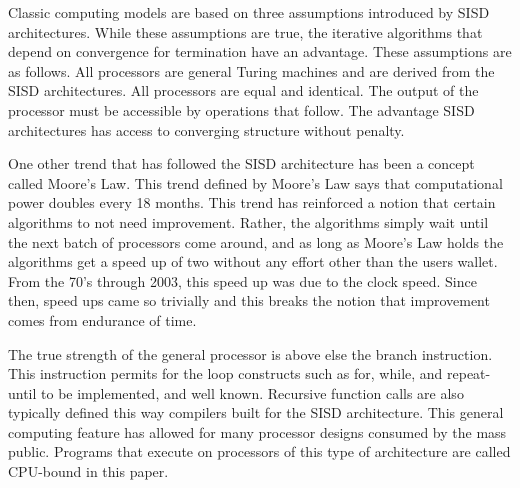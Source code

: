 \documentclass[11pt]{article}
\begin{document}
Classic computing models are based on three assumptions introduced by SISD architectures.  While these assumptions are true, %
the iterative algorithms that depend on convergence for termination have an advantage.  These assumptions are as follows.   All processors are general Turing machines and are derived from the SISD architectures.  All processors are equal and identical.   The output of the processor must be accessible by operations that follow.  The advantage SISD architectures has access to converging structure without penalty.  
 

One other trend that has followed the SISD architecture has been a concept called Moore's Law.  This trend defined by Moore's Law says that computational power doubles every 18 months.  This trend has reinforced a notion that certain algorithms to not need improvement.  Rather, the algorithms simply wait until the next batch of processors come around, and as long as Moore's Law holds the algorithms get a speed up of two without any effort other than the users wallet.  From the 70's through 2003, this speed up was due to the clock speed.  Since then, speed ups came so trivially and this breaks the notion that improvement comes from endurance of time.  

The true strength of the general processor is above else the branch instruction.  This instruction permits for the loop constructs such as for, while, and repeat-until to be implemented, and well known.  Recursive function calls are also typically defined this way compilers built for the SISD architecture.  %
This general computing feature has allowed for many processor designs consumed by the mass public.  Programs that execute on processors of this type of architecture are called CPU-bound in this paper.  
\end{document}

